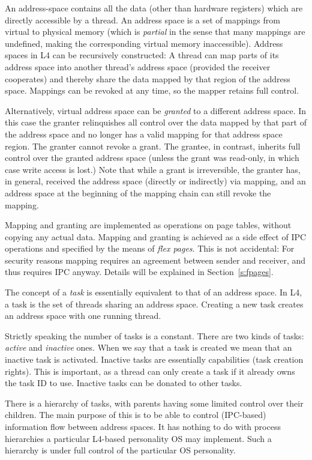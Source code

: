 An address-space contains all the data (other than hardware registers)
which are directly accessible by a thread. An address space is a set of
mappings from virtual to physical memory (which is \emph{partial} in the
sense that many mappings are undefined, making the corresponding virtual
memory inaccessible). Address spaces in L4 can be recursively
constructed: A thread can map parts of its address space into another
thread's address space (provided the receiver cooperates) and thereby
share the data mapped by that region of the address space. Mappings can
be revoked at any time, so the mapper retains full control.

Alternatively, virtual address space can be \emph{granted} to a
different address space. In this case the granter relinquishes all
control over the data mapped by that part of the address space and no
longer has a valid mapping for that address space region. The granter
cannot revoke a grant. The grantee, in contrast, inherits full control
over the granted address space (unless the grant was read-only, in which
case write access is lost.) Note that while a grant is irreversible, the
granter has, in general, received the address space (directly or
indirectly) via mapping, and an address space at the beginning of the
mapping chain can still revoke the mapping.

Mapping and granting are implemented as operations on page tables,
without copying any actual data. Mapping and granting is achieved as a
side effect of IPC operations and specified by the means of \emph{flex
pages}. This is not accidental: For security reasons mapping requires an
agreement between sender and receiver, and thus requires IPC
anyway. Details will be explained in Section~\ref{s:fpages}.

The concept of a \emph{task} is essentially equivalent to that of an
address space. In L4, a task is the set of threads sharing an address
space. Creating a new task creates an address space with one running
thread.

Strictly speaking the number of tasks is a constant. There are two kinds
of tasks: \emph{active} and \emph{inactive} ones. When we say that a
task is created we mean that an inactive task is activated. Inactive
tasks are essentially capabilities (task creation rights). This is
important, as a thread can only create a task if it already owns the
task ID to use. Inactive tasks can be donated to other tasks.



There is a hierarchy of tasks, with parents having some limited control
over their children. The main purpose of this is to be able to control
(IPC-based) information flow between address spaces. It has nothing to
do with process hierarchies a particular L4-based personality OS may
implement. Such a hierarchy is under full control of the particular OS
personality.



